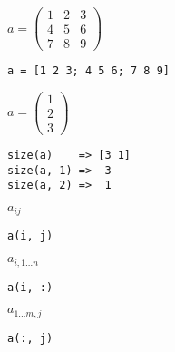 \documentclass
[
  draft    = true,
  fontsize = 11pt,
  parskip  = half-,
  BCOR     = 0pt,
  DIV      = calc,
  dvipsnames
]
{scrartcl}
\newcommand{\mathwidth}{0.29}
\newcommand{\codewidth}{0.70}
\begin{document}
\begin{minipage}{\mathwidth\textwidth}
  $\displaystyle
  a=\begin{pmatrix}
      1 & 2 & 3 \\
      4 & 5 & 6 \\
      7 & 8 & 9
    \end{pmatrix}
  $
\end{minipage}%
\hfill
\begin{minipage}{\codewidth\textwidth}
\begin{verbatim}
a = [1 2 3; 4 5 6; 7 8 9]
\end{verbatim}
\end{minipage}\bigskip

\begin{minipage}{\mathwidth\textwidth}
  $\displaystyle
  a=\begin{pmatrix}
      1 \\
      2 \\
      3
    \end{pmatrix}
  $
\end{minipage}%
\hfill
\begin{minipage}{\codewidth\textwidth}
\begin{verbatim}
size(a)    => [3 1]
size(a, 1) =>  3
size(a, 2) =>  1
\end{verbatim}
\end{minipage}\bigskip

\begin{minipage}{\mathwidth\textwidth}
  $\displaystyle
  a_{ij}
  $
\end{minipage}%
\hfill
\begin{minipage}{\codewidth\textwidth}
\begin{verbatim}
a(i, j)
\end{verbatim}
\end{minipage}\bigskip

\begin{minipage}{\mathwidth\textwidth}
  $\displaystyle
  a_{i,1\ldots n}
  $
\end{minipage}%
\hfill
\begin{minipage}{\codewidth\textwidth}
\begin{verbatim}
a(i, :)
\end{verbatim}
\end{minipage}\bigskip

\begin{minipage}{\mathwidth\textwidth}
  $\displaystyle
  a_{1\ldots m,j}
  $
\end{minipage}%
\hfill
\begin{minipage}{\codewidth\textwidth}
\begin{verbatim}
a(:, j)
\end{verbatim}
\end{minipage}\bigskip

\end{document}
